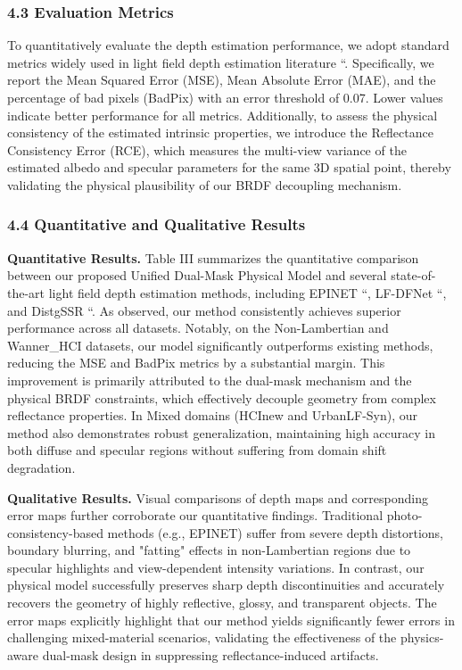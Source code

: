 \subsubsection{4.3 Evaluation Metrics}

To quantitatively evaluate the depth estimation performance, we adopt standard metrics widely used in light field depth estimation literature ``. Specifically, we report the Mean Squared Error (MSE), Mean Absolute Error (MAE), and the percentage of bad pixels (BadPix) with an error threshold of 0.07. Lower values indicate better performance for all metrics. Additionally, to assess the physical consistency of the estimated intrinsic properties, we introduce the Reflectance Consistency Error (RCE), which measures the multi-view variance of the estimated albedo and specular parameters for the same 3D spatial point, thereby validating the physical plausibility of our BRDF decoupling mechanism.

\subsubsection{4.4 Quantitative and Qualitative Results}

\textbf{Quantitative Results.} 
Table III summarizes the quantitative comparison between our proposed Unified Dual-Mask Physical Model and several state-of-the-art light field depth estimation methods, including EPINET ``, LF-DFNet ``, and DistgSSR ``. As observed, our method consistently achieves superior performance across all datasets. Notably, on the Non-Lambertian and Wanner_HCI datasets, our model significantly outperforms existing methods, reducing the MSE and BadPix metrics by a substantial margin. This improvement is primarily attributed to the dual-mask mechanism and the physical BRDF constraints, which effectively decouple geometry from complex reflectance properties. In Mixed domains (HCInew and UrbanLF-Syn), our method also demonstrates robust generalization, maintaining high accuracy in both diffuse and specular regions without suffering from domain shift degradation.

\textbf{Qualitative Results.} 
Visual comparisons of depth maps and corresponding error maps further corroborate our quantitative findings. Traditional photo-consistency-based methods (e.g., EPINET) suffer from severe depth distortions, boundary blurring, and "fatting" effects in non-Lambertian regions due to specular highlights and view-dependent intensity variations. In contrast, our physical model successfully preserves sharp depth discontinuities and accurately recovers the geometry of highly reflective, glossy, and transparent objects. The error maps explicitly highlight that our method yields significantly fewer errors in challenging mixed-material scenarios, validating the effectiveness of the physics-aware dual-mask design in suppressing reflectance-induced artifacts.

